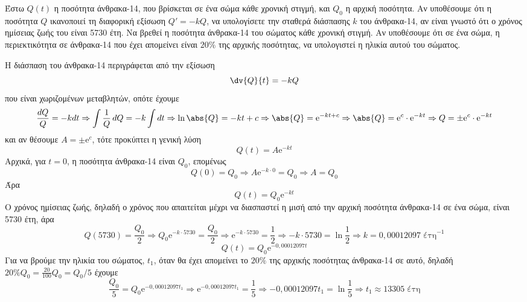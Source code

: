 \begin{myboxs1}
\begin{problem}
  Έστω $ Q(t) $ η ποσότητα άνθρακα-14, που βρίσκεται σε ένα σώμα κάθε χρονική στιγμή,
  και $ Q_{0} $ η αρχική ποσότητα. Αν υποθέσουμε ότι η ποσότητα $Q$ ικανοποιεί τη 
  διαφορική εξίσωση $ Q' = -k Q $, να υπολογίσετε την σταθερά διάσπασης $k$ του 
  άνθρακα-14, αν είναι γνωστό ότι ο χρόνος ημίσειας ζωής του είναι 5730 έτη. 
  Να βρεθεί η ποσότητα άνθρακα-14 του σώματος κάθε χρονική στιγμή. 
  Αν υποθέσουμε ότι σε ένα σώμα, η περιεκτικότητα σε άνθρακα-14 που έχει απομείνει 
  είναι $ 20 \% $ της αρχικής ποσότητας, να υπολογιστεί η ηλικία αυτού του σώματος.
\end{problem}
\end{myboxs1}
\begin{solution}
  Η διάσπαση του άνθρακα-14 περιγράφεται από την εξίσωση 
  \[
    \dv{Q}{t} = -kQ 
  \] 
  που είναι χωριζομένων μεταβλητών, οπότε έχουμε
  \[ 
    \frac{dQ}{Q} = -k dt \Rightarrow \int \frac{1}{Q} \,{dQ} = -k \int\! \,{dt} 
    \Rightarrow \ln{\abs{Q}} = -kt + c \Rightarrow \abs{Q} = \mathrm{e}^{-kt+c} 
    \Rightarrow \abs{Q} = \mathrm{e}^{c} \cdot \mathrm{e}^{-kt} 
    \Rightarrow Q = \pm \mathrm{e}^{c} \cdot \mathrm{e}^{-kt}
  \]
  και αν θέσουμε $ A = \pm \mathrm{e}^{c} $, τότε προκύπτει η γενική λύση 
  \[
    Q(t) = A \mathrm{e}^{-kt} 
  \]
  Αρχικά, για $ t=0 $, η ποσότητα άνθρακα-14 είναι $Q_{0}$, επομένως
  \[
    Q(0) = Q_{0} \Rightarrow A \mathrm{e}^{-k\cdot 0} = Q_{0} \Rightarrow A = Q_{0}
  \] 
  Άρα 
  \[
    Q(t) = Q_{0}\mathrm{e}^{-kt} 
  \] 
  Ο χρόνος ημίσειας ζωής, δηλαδή ο χρόνος που απαιτείται μέχρι να διασπαστεί η 
  μισή από την αρχική ποσότητα άνθρακα-14 σε ένα σώμα, είναι 5730 έτη, άρα 
  \[
    Q(5730) = \frac{Q_{0}}{2} \Rightarrow Q_{0} \mathrm{e}^{-k\cdot 5730} = 
    \frac{Q_{0}}{2} \Rightarrow \mathrm{e}^{-k\cdot 5730} = \frac{1}{2} \Rightarrow 
    -k \cdot 5730 = \ln{\frac{1}{2}} \Rightarrow k = 0,00012097 \; \text{έτη}^{-1}
  \] 
  \[
    Q(t) = Q_{0} \mathrm{e}^{-0,00012097t} 
  \]
  Για να βρούμε την ηλικία του σώματος, $t_{1} $, όταν θα έχει απομείνει το 
  $ 20 \% $ της αρχικής ποσότητας άνθρακα-14 σε αυτό, δηλαδή 
  $ 20 \% Q_{0} = \frac{20}{100} Q_{0} = Q_{0}/5 $ 
  έχουμε
  \[
    \frac{Q_{0}}{5} = Q_{0} \mathrm{e}^{-0,00012097t_{1}} \Rightarrow 
    \mathrm{e}^{-0,00012097t_{1}} = \frac{1}{5} \Rightarrow -0,00012097t_{1} =
    \ln{\frac{1}{5}} \Rightarrow t_{1} \approx 13305 \; \text{έτη}
  \] 
\end{solution}

